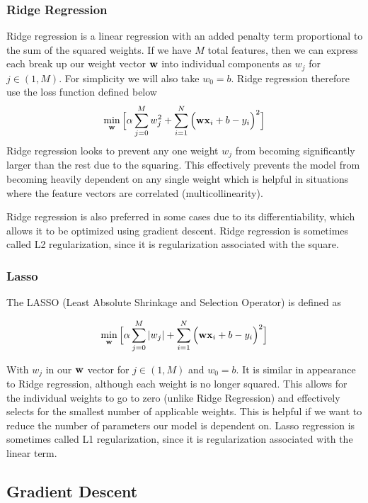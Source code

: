 \subsubsection{Ridge Regression}
Ridge regression is a linear regression with an added penalty term proportional to the sum of the squared weights. If we have $M$ total features, then we can express each break up our weight vector $\textbf{w}$ into individual components as  $w_j$ for $j\in (1,M)$. For simplicity we will also take $w_0 = b$. Ridge regression therefore use the loss function defined below
\begin{align}
    	\min_{\textbf{w}} \Big[\alpha\sum_{j=0}^Mw_j^2 + \sum_{i=1}^N\Big(\textbf{wx}_i +b - y_i\Big)^2 \Big]
\end{align}
Ridge regression looks to prevent any one weight $w_j$ from becoming significantly larger than the rest due to the squaring. This effectively prevents the model from becoming heavily dependent on any single weight which is helpful in situations where the feature vectors are correlated (multicollinearity). 

Ridge regression is also preferred in some cases due to its differentiability, which allows it to be optimized using gradient descent. Ridge regression is sometimes called L2 regularization, since it is regularization associated with the square.

\subsubsection{Lasso}
The LASSO (Least Absolute Shrinkage and Selection Operator) is defined as 

\begin{align}
    	\min_{\textbf{w}} \Big[\alpha\sum_{j=0}^M|w_j| + \sum_{i=1}^N\Big(\textbf{wx}_i +b - y_i\Big)^2 \Big]
    	\end{align}
    	
With $w_j$ in our $\textbf{w}$ vector for $j\in (1,M)$ and $w_0 = b$. It is similar in appearance to Ridge regression, although each weight is no longer squared. This  allows for the individual weights to go to zero (unlike Ridge Regression) and effectively selects for the smallest number of applicable weights. This is helpful if we want to reduce the number of parameters our model is dependent on. Lasso regression is sometimes called L1 regularization, since it is regularization associated with the linear term.


\subsection{Gradient Descent}\label{grad-descent}

